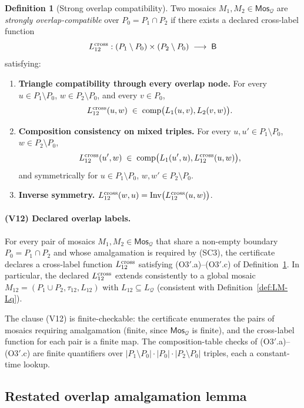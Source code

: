 \documentclass[11pt]{article}
\theoremstyle{definition}
\newtheorem{definition}[theorem]{Definition}
\theoremstyle{remark}
\newcommand{\Base}{\mathsf{B}}
\newcommand{\Inv}{\operatorname{Inv}}
\newcommand{\comp}{\operatorname{comp}}
\newcommand{\Mos}{\mathsf{Mos}}
\newcommand{\Q}{\mathcal{Q}}
\begin{document}
\begin{definition}[Strong overlap compatibility]\label{def:strong-overlap}
Two mosaics $M_1,M_2\in\Mos_\Q$ are \emph{strongly
overlap-compatible} over $P_0=P_1\cap P_2$ if there exists a
declared cross-label function
\[
  L_{12}^{\rm cross}:(P_1\setminus P_0)\times(P_2\setminus P_0)
                     \;\longrightarrow\;\Base
\]
satisfying:
\begin{enumerate}[label=(O3$'$.\alph*)]
\item \textbf{Triangle compatibility through every overlap node.}
For every $u\in P_1\setminus P_0$, $w\in P_2\setminus P_0$, and
every $v\in P_0$,
\[
  L_{12}^{\rm cross}(u,w)\;\in\;\comp\bigl(L_1(u,v),L_2(v,w)\bigr).
\]
\item \textbf{Composition consistency on mixed triples.}  For every
$u,u'\in P_1\setminus P_0$, $w\in P_2\setminus P_0$,
\[
  L_{12}^{\rm cross}(u',w)\;\in\;
    \comp\bigl(L_1(u',u),L_{12}^{\rm cross}(u,w)\bigr),
\]
and symmetrically for $u\in P_1\setminus P_0$,
$w,w'\in P_2\setminus P_0$.
\item \textbf{Inverse symmetry.}  $L_{12}^{\rm cross}(w,u)=
\Inv\bigl(L_{12}^{\rm cross}(u,w)\bigr)$.
\end{enumerate}
\end{definition}

\paragraph{(V12) Declared overlap labels.}
For every pair of mosaics $M_1,M_2\in\Mos_\Q$ that share a non-empty
boundary $P_0=P_1\cap P_2$ and whose amalgamation is required by
(SC3), the certificate declares a cross-label function
$L_{12}^{\rm cross}$ satisfying (O3$'$.a)--(O3$'$.c) of
Definition~\ref{def:strong-overlap}.  In particular, the declared
$L_{12}^{\rm cross}$ extends consistently to a global mosaic
$M_{12}=(P_1\cup P_2,\tau_{12},L_{12})$ with $L_{12}\subseteq L_\Q$
(consistent with Definition~\ref{def:LM-Lq}).

The clause (V12) is finite-checkable: the certificate enumerates
the pairs of mosaics requiring amalgamation (finite, since
$\Mos_\Q$ is finite), and the cross-label function for each pair is
a finite map.  The composition-table checks of (O3$'$.a)--(O3$'$.c)
are finite quantifiers over $|P_1\setminus P_0|\cdot|P_0|\cdot
|P_2\setminus P_0|$ triples, each a constant-time lookup.

\subsection{Restated overlap amalgamation lemma}
\end{document}
